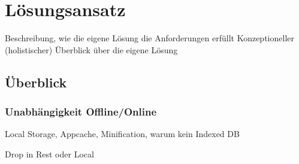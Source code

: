 \chapter{Lösungsansatz} 
\label{Kapitel 5}
Beschreibung, wie die eigene Lösung die Anforderungen erfüllt
Konzeptioneller (holistischer) Überblick über die eigene Lösung

\section{Überblick}

\subsection{Unabhängigkeit Offline/Online}\label{section:unabhaengigkeit_offline_online}
Local Storage, Appcache, Minification, warum kein Indexed DB

Drop in Rest oder Local